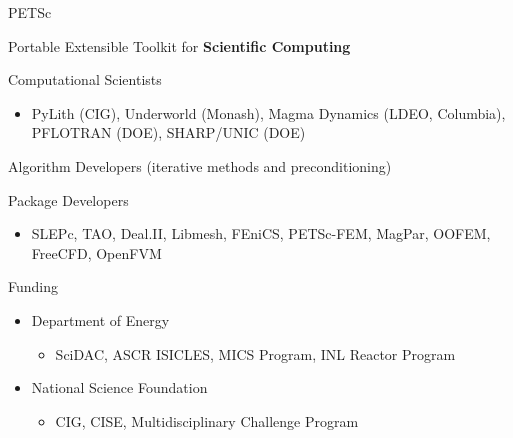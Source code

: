 \begin{frame}{PETSc}
\vspace*{-0.2cm}
\begin{center}
 Portable Extensible Toolkit for {\bf Scientific Computing}
\end{center}
\vspace*{-0.2cm}

  \begin{block}{Computational Scientists}
    \begin{itemize}\vspace*{-0.2cm}
    \item PyLith (CIG), Underworld (Monash), Magma Dynamics (LDEO, Columbia), PFLOTRAN (DOE), SHARP/UNIC (DOE)
    \end{itemize}
  \end{block}\vspace*{-0.2cm}

  
\begin{block}{ Algorithm Developers (iterative methods and preconditioning)} \end{block}\vspace*{-0.4cm}


  \begin{block}{ Package Developers}
    \begin{itemize} \vspace*{-0.2cm}
    \item SLEPc, TAO, Deal.II, Libmesh, FEniCS, PETSc-FEM, MagPar, OOFEM, FreeCFD, OpenFVM
    \end{itemize}
  \end{block}\vspace*{-0.2cm}

  \begin{block}{Funding}
    \begin{itemize} \vspace*{-0.2cm}    
      \item Department of Energy
      \begin{itemize}\item SciDAC, ASCR ISICLES, MICS Program, INL Reactor Program
      \end{itemize}
    \item National Science Foundation
      \begin{itemize}\item CIG, CISE, Multidisciplinary Challenge Program
      \end{itemize}
    \end{itemize}
  \end{block}\vspace*{-0.2cm}


\end{frame}
